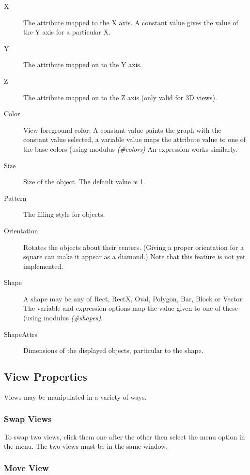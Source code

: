 \begin{description}
	\item[X] The attribute mapped to the X axis. A constant value gives the
		value of the Y axis for a particular X.
	\item[Y] The attribute mapped on to the Y axis.
	\item[Z] The attribute mapped on to the Z axis (only valid for 3D views).
	\item[Color] View foreground color. A constant value paints the graph with
		the constant value selected, a variable value maps the attribute value
		to one of the base colors (using modulus {\em (\#colors)} An expression
		works similarly.
	\item[Size] Size of the object. The default value is 1.
	\item[Pattern] The filling style for objects.
	\item[Orientation] Rotates the objects about their centers. (Giving a
		proper orientation for a square can make it appear as a diamond.)
		Note that this feature is not yet implemented.
	\item[Shape] A shape may be any of Rect, RectX, Oval, Polygon, Bar, Block
		or Vector. The variable and expression options map the value
		given to one of these (using modulus {\em (\#shapes)}.
	\item[ShapeAttrs] Dimensions of the displayed objects, particular to the
		shape.
\end{description}


\subsection{View Properties}

Views may be manipulated in a variety of ways.

\subsubsection{Swap Views}

To swap two views, click them one after the other then select the  menu option in the  menu. The two views must be in the same
window.

\subsubsection{Move View}

